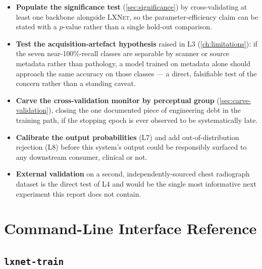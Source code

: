 \documentclass[11pt,a4paper,oneside]{report}
\newcommand{\LXNet}{\textsc{LXNet}}
\newcommand{\code}[1]{\texttt{\small #1}}
\begin{document}
\begin{itemize}
\item \textbf{Populate the significance test} (\cref{sec:significance}) by
  cross-validating at least one backbone alongside \LXNet{}, so the
  parameter-efficiency claim can be stated with a $p$-value rather than a
  single hold-out comparison.
\item \textbf{Test the acquisition-artefact hypothesis} raised in L3
  (\cref{ch:limitations}): if the seven near-100\%-recall classes are
  separable by scanner or source metadata rather than pathology, a model
  trained on metadata alone should approach the same accuracy on those
  classes --- a direct, falsifiable test of the concern rather than a
  standing caveat.
\item \textbf{Carve the cross-validation monitor by perceptual group}
  (\cref{sec:carve-validation}), closing the one documented piece of
  engineering debt in the training path, if the stopping epoch is ever
  observed to be systematically late.
\item \textbf{Calibrate the output probabilities} (L7) and add
  out-of-distribution rejection (L8) before this system's output could be
  responsibly surfaced to any downstream consumer, clinical or not.
\item \textbf{External validation} on a second, independently-sourced chest
  radiograph dataset is the direct test of L4 and would be the single most
  informative next experiment this report does not contain.
\end{itemize}

\appendix

\chapter{Command-Line Interface Reference}
\label{ap:cli}

\section{\code{lxnet-train}}
\end{document}
